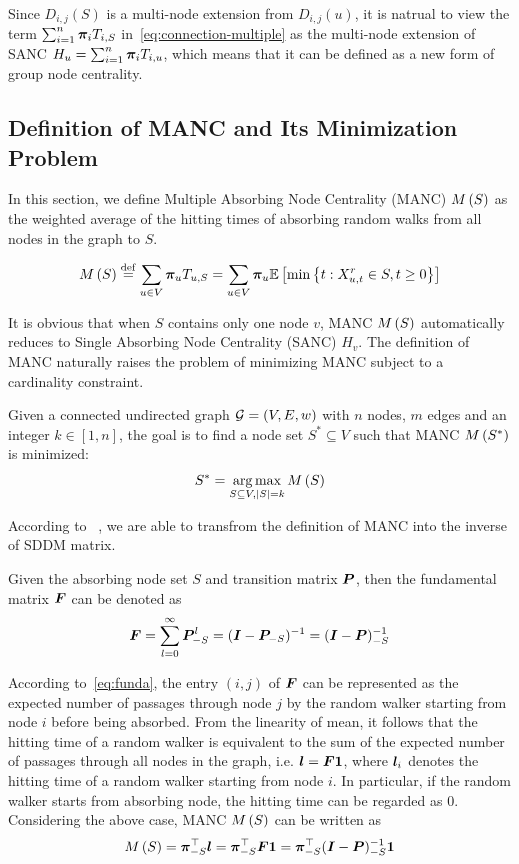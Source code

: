 \documentclass[sigconf]{acmart}
\begin{document}
Since \(D_{i,j}(S)\) is a multi-node extension from \(D_{i,j}(u)\), it is natrual to view the term \(\sum_{i=1}^n\boldsymbol{\pi}_iT_{i,S}\) in~\eqref{eq:connection-multiple} as the multi-node extension of SANC \(H_u=\sum_{i=1}^n\boldsymbol{\pi}_iT_{i,u}\), which means that it can be defined as a new form of group node centrality.

\subsection{Definition of MANC and Its Minimization Problem}\label{subsec:def-manc}

In this section, we define Multiple Absorbing Node Centrality (MANC) \(M\left(S\right)\) as the weighted average of the hitting times of absorbing random walks from all nodes in the graph to \(S\).

\begin{definition}[MANC]\label{def:manc}
    \[M\left(S\right)\stackrel{\mathrm{def}}{=}\sum_{u\in V}\boldsymbol{\pi}_u T_{u,S}=\sum_{u\in V}\boldsymbol{\pi}_u \mathbb{E}\left[\min\left\{t:X_{u,t}^r\in S,t\ge0 \right\}\right]\]
\end{definition}

It is obvious that when \(S\) contains only one node \(v\), MANC \(M\left(S\right)\) automatically reduces to Single Absorbing Node Centrality (SANC) \(H_v\).
The definition of MANC naturally raises the problem of minimizing MANC subject to a cardinality constraint.

\begin{problem}
Given a connected undirected graph \(\mathcal{G}=(V,E,w)\) with \(n\) nodes, \(m\) edges and an integer \(k\in[1,n]\), the goal is to find a node set \(S^*\subseteq V\) such that MANC \(M\left(S^*\right)\) is minimized:
\[S^*=\operatorname*{arg\,max}_{S\subseteq V,\left|S \right|=k}M\left(S\right)\]
\end{problem}

According to ~\cite{KeSn76}, we are able to transfrom the definition of MANC into the inverse of SDDM matrix.

\begin{fact}
    Given the absorbing node set \(S\) and transition matrix \(\boldsymbol{P}\), then the fundamental matrix \(\boldsymbol{F}\) can be denoted as
    \begin{equation}\label{eq:funda}
        \boldsymbol{F}=\sum_{l=0}^\infty\boldsymbol{P}_{-S}^l=(\boldsymbol{I}-\boldsymbol{P}_{-S})^{-1}=(\boldsymbol{I}-\boldsymbol{P})_{-S}^{-1}
    \end{equation}
\end{fact}

According to~\eqref{eq:funda}, the entry \((i,j)\) of \(\boldsymbol{F}\) can be represented as the expected number of passages through node \(j\) by the random walker starting from node \(i\) before being absorbed.
From the linearity of mean, it follows that the hitting time of a random walker is equivalent to the sum of the expected number of passages through all nodes in the graph, i.e. \(\boldsymbol{l}=\boldsymbol{F}\boldsymbol{1}\), where \(\boldsymbol{l}_i\) denotes the hitting time of a random walker starting from node \(i\).
In particular, if the random walker starts from absorbing node, the hitting time can be regarded as \(0\). Considering the above case, MANC \(M\left(S\right)\) can be written as
\[M\left(S\right)=\boldsymbol{\pi}_{-S}^\top\boldsymbol{l}=\boldsymbol{\pi}_{-S}^\top\boldsymbol{F}\boldsymbol{1}=\boldsymbol{\pi}_{-S}^\top(\boldsymbol{I}-\boldsymbol{P})_{-S}^{-1}\boldsymbol{1}\]
\end{document}
